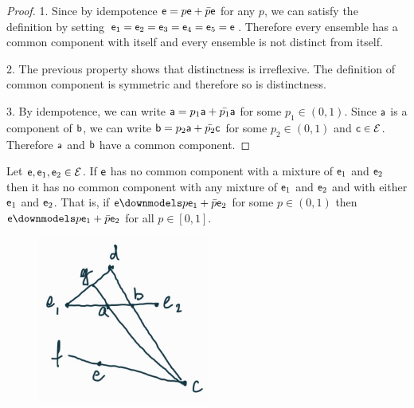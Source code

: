 \begin{proof}
	1. Since by idempotence $\ens = p \ens + \bar{p} \ens$ for any $p$, we can satisfy the definition by setting $\ens_1 = \ens_2 = \ens_3 = \ens_4 = \ens_5 = \ens$. Therefore every ensemble has a common component with itself and every ensemble is not distinct from itself.
	
	2. The previous property shows that distinctness is irreflexive. The definition of common component is symmetric and therefore so is distinctness.
	
	3. By idempotence, we can write $\ens[a] = p_1 \ens[a] + \bar{p_1} \ens[a]$ for some $p_1 \in (0,1)$. Since $\ens[a]$ is a component of $\ens[b]$, we can write $\ens[b] = p_2 \ens[a] + \bar{p_2} \ens[c]$ for some $p_2 \in (0, 1)$ and $\ens[c] \in \Ens$. Therefore $\ens[a]$ and $\ens[b]$ have a common component.
\end{proof}

\begin{prop}
	Let $\ens,\ens_1,\ens_2 \in \Ens$. If $\ens$ has no common component with a mixture of $\ens_1$ and $\ens_2$ then it has no common component with any mixture of $\ens_1$ and $\ens_2$ and with either $\ens_1$ and $\ens_2$. That is, if $\ens \distinct p \ens_1 + \bar{p} \ens_2$ for some $p \in (0, 1)$ then $\ens \distinct p \ens_1 + \bar{p} \ens_2$ for all $p \in [0, 1]$.
\end{prop}

\begin{figure}[h]
	\includegraphics[width=0.5\textwidth]{tempimages/DistinctAndMixture.jpg}
\end{figure}

